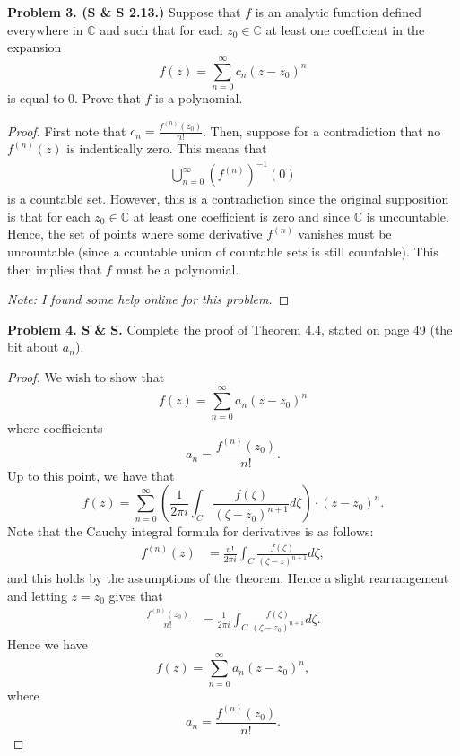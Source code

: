 \documentclass[leqno]{article}
\theoremstyle{nonumberplain}
\newtheorem{proof}{Proof}
\newcommand{\C}{\mathbb{C}}
\begin{document}
\vspace*{1cm}

\noindent\textbf{Problem 3. (S \& S 2.13.)} Suppose that $f$ is an analytic function defined everywhere in $\C$ and such that for each $z_0 \in \C$ at least one coefficient in the expansion
\[
f(z)=\sum_{n=0}^\infty c_n (z-z_0)^n
\]
is equal to 0. Prove that $f$ is a polynomial.

\begin{proof}
First note that $c_n= \frac{f^(n)(z_0)}{n!}$. Then, suppose for a contradiction that no $f^(n)(z)$ is indentically zero. This means that
\begin{align*}
\bigcup_{n=0}^\infty (f^(n))^{-1}(0)
\end{align*}
is a countable set.  However, this is a contradiction since the original supposition is that for each $z_0\in \C$ at least one coefficient is zero and since $\C$ is uncountable.  Hence, the set of points where some derivative $f^(n)$ vanishes must be uncountable (since a countable union of countable sets is still countable).  This then implies that $f$ must be a polynomial.

\noindent \emph{Note: I found some help online for this problem.}
\end{proof}

\vspace*{1cm}

\noindent\textbf{Problem 4. S \& S.} Complete the proof of Theorem 4.4,  stated on page 49 (the bit about $a_n$).


\begin{proof}
We wish to show that 
\[
f(z)=\sum_{n=0}^\infty a_n(z-z_0)^n
\]
where coefficients
\[
a_n= \frac{f^{(n)}(z_0)}{n!}.
\]
Up to this point, we have that
\[
f(z)=\sum_{n=0}^\infty \left( \frac{1}{2\pi i} \int_C \frac{f(\zeta)}{(\zeta-z_0)^{n+1}}d\zeta \right)\cdot (z-z_0)^n.
\]
Note that the Cauchy integral formula for derivatives is as follows:
\begin{align*}
f^{(n)}(z)&=\frac{n!}{2\pi i} \int_C \frac{f(\zeta)}{(\zeta-z)^{n+1}}d\zeta,
\end{align*}
and this holds by the assumptions of the theorem.  Hence a slight rearrangement and letting $z=z_0$ gives that 
\begin{align*}
\frac{f^{(n)}(z_0)}{n!}&=\frac{1}{2\pi i} \int_C \frac{f(\zeta)}{(\zeta-z_0)^{n+1}}d\zeta.
\end{align*}
Hence we have
\[
f(z)=\sum_{n=0}^\infty a_n(z-z_0)^n,
\] 
where 
\[
a_n= \frac{f^{(n)}(z_0)}{n!}.
\]
\end{proof}
\end{document}
